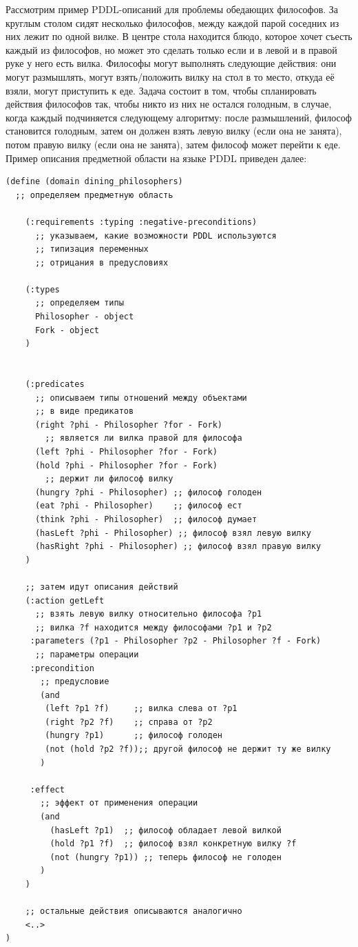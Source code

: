 \documentclass[a4paper,14pt]{extreport}
\begin{document}
    Рассмотрим пример PDDL-описаний для проблемы обедающих философов. За круглым столом сидят несколько философов, между каждой парой соседних из них лежит по одной вилке. В центре стола находится блюдо, которое хочет съесть каждый из философов, но может это сделать только если и в левой и в правой руке у него есть вилка. Философы могут выполнять следующие действия: они могут размышлять,  могут взять/положить вилку на стол в то место, откуда её взяли, могут приступить к еде. Задача состоит в том, чтобы спланировать действия философов так, чтобы никто из них не остался голодным, в случае, когда каждый подчиняется следующему алгоритму: после размышлений, философ становится голодным, затем он должен взять левую вилку (если она не занята), потом правую вилку (если она не занята), затем философ может перейти к еде. Пример описания предметной области на языке PDDL приведен далее:

\linespread{0.80}    
\begin{verbatim}
(define (domain dining_philosophers)
  ;; определяем предметную область
  
    (:requirements :typing :negative-preconditions)
      ;; указываем, какие возможности PDDL используются
      ;; типизация переменных
      ;; отрицания в предусловиях
    
    (:types
      ;; определяем типы
      Philosopher - object
      Fork - object
    )
    
    
    (:predicates
      ;; описываем типы отношений между объектами
      ;; в виде предикатов
      (right ?phi - Philosopher ?for - Fork) 
        ;; является ли вилка правой для философа
      (left ?phi - Philosopher ?for - Fork)
      (hold ?phi - Philosopher ?for - Fork)
        ;; держит ли философ вилку
      (hungry ?phi - Philosopher) ;; философ голоден
      (eat ?phi - Philosopher)    ;; философ ест
      (think ?phi - Philosopher)  ;; философ думает
      (hasLeft ?phi - Philosopher) ;; философ взял левую вилку
      (hasRight ?phi - Philosopher) ;; философ взял правую вилку
    )

    ;; затем идут описания действий    
    (:action getLeft
      ;; взять левую вилку относительно философа ?p1
      ;; вилка ?f находится между философами ?p1 и ?p2 
     :parameters (?p1 - Philosopher ?p2 - Philosopher ?f - Fork)
      ;; параметры операции
     :precondition 
       ;; предусловие
       (and
        (left ?p1 ?f)     ;; вилка слева от ?p1
        (right ?p2 ?f)    ;; справа от ?p2
        (hungry ?p1)      ;; философ голоден
        (not (hold ?p2 ?f));; другой философ не держит ту же вилку
       )
       
     :effect
       ;; эффект от применения операции
       (and
         (hasLeft ?p1)  ;; философ обладает левой вилкой
         (hold ?p1 ?f)  ;; философ взял конкретную вилку ?f
         (not (hungry ?p1)) ;; теперь философ не голоден
       )
    )
    
    ;; остальные действия описываются аналогично
    <..>
)

\end{verbatim}
\linespread{1.25}
\end{document}
